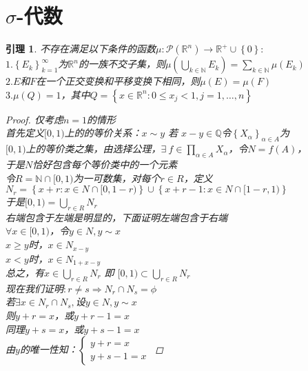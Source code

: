 \documentclass[12pt, a4paper, oneside]{ctexbook}
\newtheorem{lemma}[theorem]{引理}
\begin{document}
\section{$\sigma$-代数}
\begin{lemma}
    不存在满足以下条件的函数$\mu:\mathcal{P}(\mathbb{R}^n)\rightarrow \mathbb{R}^{+}\cup\left\{0\right\}:$\\
    $1.\left\{E_k\right\}_{k=1}^{\infty}$为$\mathbb{R}^n$的一族不交子集，则$\mu(\bigcup_{k\in\mathbb{N}}E_k)=\sum_{k\in\mathbb{N}}\mu(E_k)$\\
    $2.E$和$F$在一个正交变换和平移变换下相同，则$\mu(E)=\mu(F)$\\
    $3.\mu(Q)=1$，其中$Q=\left\{x\in\mathbb{R}^n:0\leq x_j <1,j=1,\dots,n\right\}$
    \begin{proof}
        仅考虑$n=1$的情形\\
        首先定义$[0,1)$上的的等价关系：$x\sim y$ 若 $x-y\in\mathbb{Q}$令$\left\{X_{\alpha}\right\}_{\alpha\in A}$为\\
        $[0,1)$上的等价类之集，由选择公理，$\exists\ f\in\prod_{\alpha\in A}X_{\alpha}$，令$N=f(A)$，\\
        于是$N$恰好包含每个等价类中的一个元素\\
        令$R=\mathbb{N}\cap [0,1)$为一可数集，对每个$r\in R$，定义\\
        $N_{r}=\left\{x+r:x\in N\cap [0,1-r)\right\}\cup\left\{x+r-1:x\in N\cap [1-r,1)\right\}$\\
        于是$[0,1)=\bigcup_{r\in R}N_r$\\
        右端包含于左端是明显的，下面证明左端包含于右端\\
        $\forall x\in[0,1)$，令$y\in N,y\sim x$\\
        $x\geq y$时，$x\in N_{x-y}$\\
        $x<y$时，$x\in N_{1+x-y}$\\
        总之，有$x\in\bigcup_{r\in R}N_r$ 即 $[0,1)\subset \bigcup_{r\in R}N_r$\\
        现在我们证明$:r\neq s\Rightarrow N_r\cap N_s=\phi$\\
        若$\exists x\in N_r\cap N_s,$设$y\in N,y\sim x$\\
        则$y+r=x$，或$y+r-1=x$\\
        同理$y+s=x$，或$y+s-1=x$\\
        由$y$的唯一性知：$\left\{\begin{matrix}
            y+r=x\\
           y+s-1=x
           \end{matrix}\right.$

\end{proof}
\end{lemma}
\end{document}

